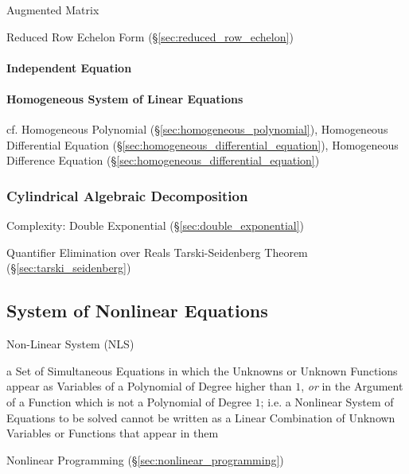 Augmented Matrix

Reduced Row Echelon Form (\S\ref{sec:reduced_row_echelon})



\paragraph{Independent Equation}\label{sec:independent_equation}\hfill

\paragraph{Homogeneous System of Linear Equations}\hfill
\label{sec:homogeneous_linear_equation_system}

cf. Homogeneous Polynomial (\S\ref{sec:homogeneous_polynomial}), Homogeneous
Differential Equation (\S\ref{sec:homogeneous_differential_equation}),
Homogeneous Difference Equation (\S\ref{sec:homogeneous_differential_equation})



\subsubsection{Cylindrical Algebraic Decomposition}
\label{sec:cylindrical_algebraic_decomposition}

Complexity: Double Exponential (\S\ref{sec:double_exponential})

Quantifier Elimination over Reals \fist Tarski-Seidenberg Theorem
(\S\ref{sec:tarski_seidenberg})



\subsection{System of Nonlinear Equations}\label{sec:nonlinear_equation_system}

Non-Linear System (NLS)

a Set of Simultaneous Equations in which the Unknowns or Unknown Functions
appear as Variables of a Polynomial of Degree higher than $1$, \emph{or} in the
Argument of a Function which is not a Polynomial of Degree $1$; i.e. a
Nonlinear System of Equations to be solved cannot be written as a Linear
Combination of Unknown Variables or Functions that appear in them

\fist Nonlinear Programming (\S\ref{sec:nonlinear_programming})

